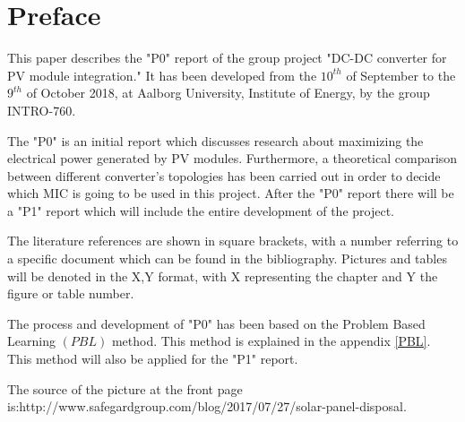 \chapter*{Preface}

This paper describes the "P0" report of the group project "DC-DC converter for PV module integration." It has been developed from the $10^{th}$ of September to the $9^{th}$ of October 2018, at Aalborg University, Institute of Energy, by the group INTRO-760.

The "P0" is an initial report which discusses research about maximizing the electrical power generated by PV modules.
Furthermore, a theoretical comparison between different converter's topologies has been carried out in order to decide which MIC is going to be used in this project. After the "P0" report there will be a "P1" report which will include the entire development of the project.

The literature references are shown in square brackets, with a number referring to a specific document which can be found in the bibliography. Pictures and tables will be denoted in the X,Y format, with X representing the chapter and Y the figure or table number. 

The process and development of "P0" has been based on the Problem Based Learning $(PBL)$ method. This method is explained in the appendix \ref{PBL}. This method will also be applied for the "P1" report.

The source of the picture at the front page is:\newline http://www.safegardgroup.com/blog/2017/07/27/solar-panel-disposal\cite{frontpage_pic}.
